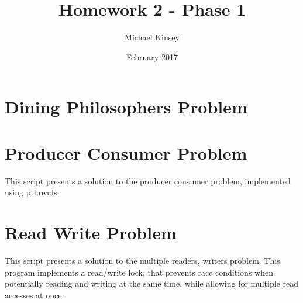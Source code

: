 \documentclass[a4paper]{article}
\begin{document}
\title{Homework 2 - Phase 1}
\author{Michael Kinsey}
\date{February 2017}
\maketitle

\section{Dining Philosophers Problem}



\section{Producer Consumer Problem}

    This script presents a solution to the producer consumer problem, 
    implemented using pthreads.

\section{Read Write Problem}

    This script presents a solution to the multiple readers, writers problem. This program implements a read/write lock,
    that prevents race conditions when potentially reading and writing at the same time, while allowing for multiple
    read accesses at once.
\end{document}
